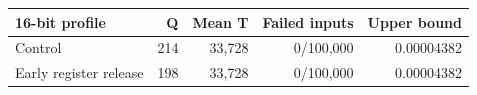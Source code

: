 \begin{tabular}{lrrrr}
\toprule
16-bit profile & Q & Mean T & Failed inputs & Upper bound \\
\midrule
Control & 214 & 33,728 & 0/100,000 & 0.00004382 \\
Early register release & 198 & 33,728 & 0/100,000 & 0.00004382 \\
\bottomrule
\end{tabular}
